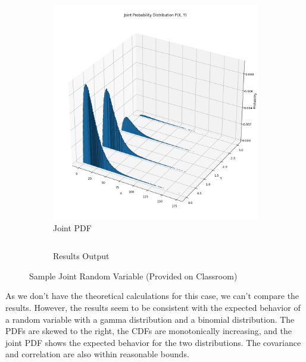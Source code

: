 \documentclass{article}
\begin{document}
\begin{figure}[H]
\begin{subfigure}{0.45\textwidth}
    \includegraphics[width=\linewidth]{results/section2/a(2).png}
    \caption{Joint PDF}
  \end{subfigure}
  \begin{subfigure}{\textwidth}
    \inputminted{text}{results/section2/a.txt}
    \caption{Results Output}
  \end{subfigure}
  \caption{Sample Joint Random Variable (Provided on Classroom)}
\end{figure}

As we don't have the theoretical calculations for this case, we can't compare the results. However, the results seem to be consistent with the expected behavior of a random variable with a gamma distribution and a binomial distribution. The PDFs are skewed to the right, the CDFs are monotonically increasing, and the joint PDF shows the expected behavior for the two distributions. The covariance and correlation are also within reasonable bounds.

\newpage
\end{document}

